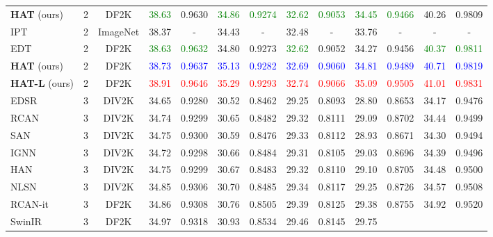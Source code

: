 \documentclass[10pt,twocolumn,letterpaper]{article}
\begin{document}
\begin{table*}[!ht]
\begin{center}
{\begin{tabular}{|l|c|c|c|c|c|c|c|c|c|c|c|c|}
\\
\textbf{HAT} (ours) & 2 & DF2K & \textcolor{green}{38.63}
& {0.9630}
& \textcolor{green}{34.86}
& \textcolor{green}{0.9274}
& \textcolor{green}{32.62}
& \textcolor{green}{0.9053}
& \textcolor{green}{34.45}
& \textcolor{green}{0.9466}
& {40.26}
& {0.9809}
\\
\hdashline
IPT & 2 & ImageNet & {38.37}
& {-}
& {34.43}
& {-}
& {32.48}
& {-}
& {33.76}
& {-}
& {-}
& {-}
\\
EDT & 2 & DF2K & \textcolor{green}{38.63}
& \textcolor{green}{0.9632}
& 34.80
& 0.9273
& \textcolor{green}{32.62}
& {0.9052}
& 34.27
& 0.9456
& \textcolor{green}{40.37}
& \textcolor{green}{0.9811}
\\
\textbf{HAT} (ours) & 2 & DF2K & \textcolor{blue}{38.73}
& \textcolor{blue}{0.9637}
& \textcolor{blue}{35.13}
& \textcolor{blue}{0.9282}
& \textcolor{blue}{32.69}
& \textcolor{blue}{0.9060}
& \textcolor{blue}{34.81}
& \textcolor{blue}{0.9489}
& \textcolor{blue}{40.71}
& \textcolor{blue}{0.9819}
\\
\textbf{HAT-L} (ours) & 2 & DF2K & \textcolor{red}{38.91}
& \textcolor{red}{0.9646}
& \textcolor{red}{35.29}
& \textcolor{red}{0.9293}
& \textcolor{red}{32.74}
& \textcolor{red}{0.9066}
& \textcolor{red}{35.09}
& \textcolor{red}{0.9505}
& \textcolor{red}{41.01}
& \textcolor{red}{0.9831}
\\
\hline
\hline
EDSR & 3 & DIV2K & 34.65
& 0.9280
& 30.52
& 0.8462
& 29.25
& 0.8093
& 28.80
& 0.8653
& 34.17
& 0.9476
\\
RCAN & 3 & DIV2K & 34.74
& 0.9299
& 30.65
& 0.8482
& 29.32
& 0.8111
& 29.09
& 0.8702
& 34.44
& 0.9499
\\
SAN & 3 & DIV2K & {34.75}
& {0.9300}
& {30.59}
& {0.8476}
& {29.33}
& {0.8112}
& {28.93}
& {0.8671}
& {34.30}
& {0.9494}
\\
IGNN & 3 & DIV2K & {34.72}
& {0.9298}
& {30.66}
& {0.8484}
& {29.31}
& {0.8105}
& {29.03}
& {0.8696}
& {34.39}
& {0.9496}
\\
HAN  & 3 & DIV2K & {34.75}
& {0.9299}
& {30.67}
& {0.8483}
& {29.32}
& {0.8110}
& {29.10}
& {0.8705}
& {34.48}
& {0.9500}
\\
NLSN & 3 & DIV2K & 34.85 
& 0.9306 
& 30.70 
& 0.8485 
& 29.34 
& 0.8117 
& {29.25}
& {0.8726}
& 34.57 
& 0.9508  
\\
RCAN-it & 3 & DF2K & {34.86}
& {0.9308}
& {30.76}
& {0.8505}
& {29.39}
& {0.8125}
& {29.38}
& {0.8755}
& {34.92}
& {0.9520}
\\
SwinIR & 3 & DF2K & 34.97
& 0.9318
& 30.93
& 0.8534
& 29.46
& 0.8145
& 29.75

\end{tabular}}
\end{center}
\end{table*}
\end{document}
